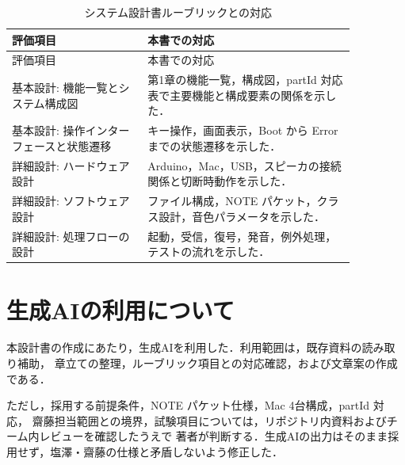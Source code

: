 \documentclass[lualatex,book,openany,paper=a4paper,jafontsize=11.5pt,jafontscale=1.05]{jlreq}
\begin{document}
\begin{longtable}{p{0.34\linewidth}p{0.52\linewidth}}
\caption{システム設計書ルーブリックとの対応}\label{tab:rubric}\\
\hline
評価項目 & 本書での対応 \\
\hline
\endfirsthead
\hline
評価項目 & 本書での対応 \\
\hline
\endhead
基本設計: 機能一覧とシステム構成図 & 第1章の機能一覧，構成図，partId 対応表で主要機能と構成要素の関係を示した． \\
\hline
基本設計: 操作インターフェースと状態遷移 & キー操作，画面表示，Boot から Error までの状態遷移を示した． \\
\hline
詳細設計: ハードウェア設計 & Arduino，Mac，USB，スピーカの接続関係と切断時動作を示した． \\
\hline
詳細設計: ソフトウェア設計 & ファイル構成，NOTE パケット，クラス設計，音色パラメータを示した． \\
\hline
詳細設計: 処理フローの設計 & 起動，受信，復号，発音，例外処理，テストの流れを示した． \\
\hline
\end{longtable}

\chapter{生成AIの利用について}
本設計書の作成にあたり，生成AIを利用した．利用範囲は，既存資料の読み取り補助，
章立ての整理，ルーブリック項目との対応確認，および文章案の作成である．

ただし，採用する前提条件，NOTE パケット仕様，Mac 4台構成，partId 対応，
齋藤担当範囲との境界，試験項目については，リポジトリ内資料およびチーム内レビューを確認したうえで
著者が判断する．生成AIの出力はそのまま採用せず，塩澤・齋藤の仕様と矛盾しないよう修正した．
\end{document}
